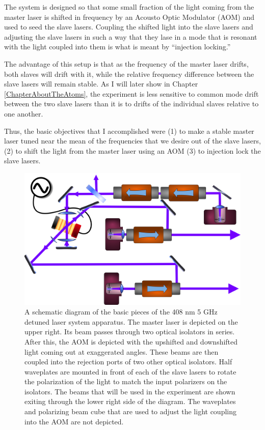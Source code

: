 The system is designed so that some small fraction of the light coming from the master laser is shifted in frequency by an Acousto Optic Modulator (AOM) and used to seed the slave lasers. Coupling the shifted light into the slave lasers and adjusting the slave lasers in such a way that they lase in a mode that is resonant with the light coupled into them is what is meant by ``injection locking.'' 

The advantage of this setup is that as the frequency of the master laser drifts, both slaves will drift with it, while the relative frequency difference between the slave lasers will remain stable.  As I will later show in Chapter \ref{ChapterAboutTheAtoms}, the experiment is less sensitive to common mode drift between the two slave lasers than it is to drifts of the individual slaves relative to one another. 


Thus, the basic objectives that I accomplished were (1) to make a stable master laser tuned near the mean of the frequencies that we desire out of the slave lasers, (2) to shift the light from the master laser using an AOM (3) to injection lock the slave lasers.

\begin{figure}
    \centerline{\includegraphics[width=1\textwidth]{diagramOfSetup3}}
    \caption[Schematic diagram of the laser system]{\label{diagramOfSetup3}
	A schematic diagram of the basic pieces of the 408 nm 5 GHz detuned laser system apparatus. The master laser is depicted on the upper right. Its beam passes through two optical isolators in series. After this, the AOM is depicted with the upshifted and downshifted light coming out at exaggerated angles. These beams are then coupled into the rejection ports of two other optical isolators. Half waveplates are mounted in front of each of the slave lasers to rotate the polarization of the light to match the input polarizers on the isolators. The beams that will be used in the experiment are shown exiting through the lower right side of the diagram. The waveplates and polarizing beam cube that are used to adjust the light coupling into the AOM are not depicted.
    }
\end{figure}
